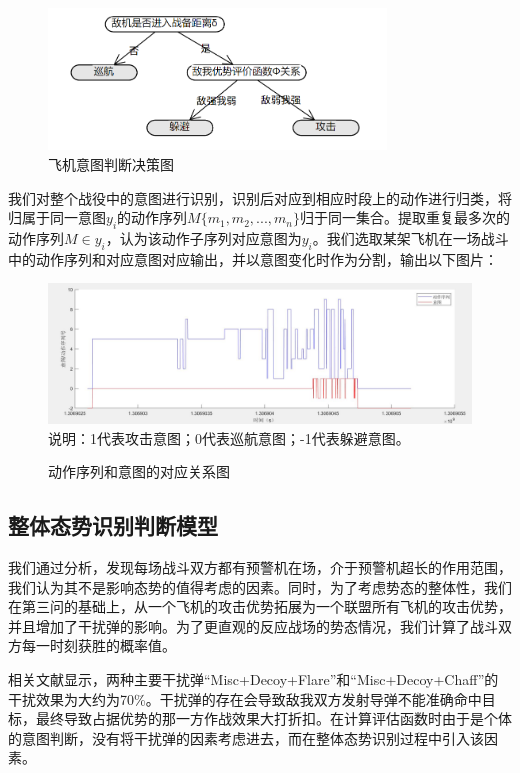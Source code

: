 \documentclass{my_paper}
\begin{document}
\begin {figure}[h]
\centering %
\includegraphics[width=0.8\textwidth]{yitu.png}
\caption{飞机意图判断决策图} %
\label{pdjc}
\end {figure}


我们对整个战役中的意图进行识别，识别后对应到相应时段上的动作进行归类，将归属于同一意图$y_i$的动作序列$M\{m_1,m_2,...,m_n\}$归于同一集合。提取重复最多次的动作序列$M\in y_i$，认为该动作子序列对应意图为$y_i$。我们选取某架飞机在一场战斗中的动作序列和对应意图对应输出，并以意图变化时作为分割，输出以下图片：

\begin {figure}[h]
\centering %
\includegraphics[width=\textwidth]{9.jpg}
说明：1代表攻击意图；0代表巡航意图；-1代表躲避意图。
\caption{动作序列和意图的对应关系图} %
\label{five}
\end {figure}


\subsection{整体态势识别判断模型}
我们通过分析，发现每场战斗双方都有预警机在场，介于预警机超长的作用范围，我们认为其不是影响态势的值得考虑的因素。同时，为了考虑势态的整体性，我们在第三问的基础上，从一个飞机的攻击优势拓展为一个联盟所有飞机的攻击优势，并且增加了干扰弹的影响。为了更直观的反应战场的势态情况，我们计算了战斗双方每一时刻获胜的概率值。

相关文献显示\cite{12}，两种主要干扰弹“Misc+Decoy+Flare”和“Misc+Decoy+Chaff”的干扰效果为大约为70\%。干扰弹的存在会导致敌我双方发射导弹不能准确命中目标，最终导致占据优势的那一方作战效果大打折扣。在计算评估函数时由于是个体的意图判断，没有将干扰弹的因素考虑进去，而在整体态势识别过程中引入该因素。
\end{document}
